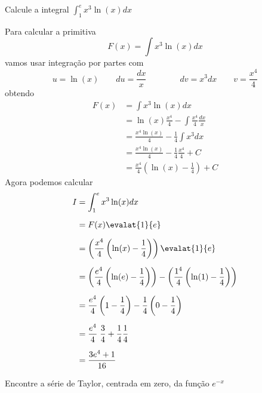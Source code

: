 \documentclass[a4paper,12pt,fleqn]{article}
\begin{document}
Calcule a integral
\(
  \int_1^e x^3\ln(x) dx
\)

\begin{answer}
  Para calcular a primitiva
  \[
    F(x) = \int x^3\ln(x) dx
  \]
  vamos usar integração por partes com
  \[
    u = \ln(x) \qquad du = \frac{dx}{x} \qquad\qquad
    dv = x^3dx \qquad v = \frac{x^4}{4}
  \]
  obtendo
  \begin{align*}
    F(x)
    & = \int x^3\ln(x) dx \\[2mm]
    & = \ln(x)\frac{x^4}{4} - \int \frac{x^4}{4} \frac{dx}{x} \\[2mm]
    & = \frac{x^4\ln(x)}{4} - \frac{1}{4} \int x^3 dx  \\[2mm]
    & = \frac{x^4\ln(x)}{4} - \frac{1}{4} \frac{x^4}{4} + C  \\[2mm]
    & = \frac{x^4}{4}\left(\ln(x) - \frac{1}{4}\right) + C
  \end{align*}
  Agora podemos calcular
  \begin{align*}
    I
    & = \int_1^e x^3\ln(x) dx \\[2mm]
    & = F(x)\evalat{1}{e} \\[2mm]
    & = \left(\frac{x^4}{4}\left(\ln(x) - \frac{1}{4}\right)\right)\evalat{1}{e} \\[2mm]
    & = \left(\frac{e^4}{4}\left(\ln(e) - \frac{1}{4}\right)\right)
      - \left(\frac{1^4}{4}\left(\ln(1) - \frac{1}{4}\right)\right) \\[2mm]
    & = \frac{e^4}{4}\left(1 - \frac{1}{4}\right)
      - \frac{1}{4}\left(0 - \frac{1}{4}\right) \\[2mm]
    & = \frac{e^4}{4}\;\frac{3}{4}
      + \frac{1}{4}\frac{1}{4} \\[2mm]
    & = \frac{3e^4+ 1}{16}
  \end{align*}
  \clearpage
\end{answer}

Encontre a série de Taylor, centrada em zero, da função \(e^{-x}\)

\begin{answer}
\end{answer}

\end{document}

